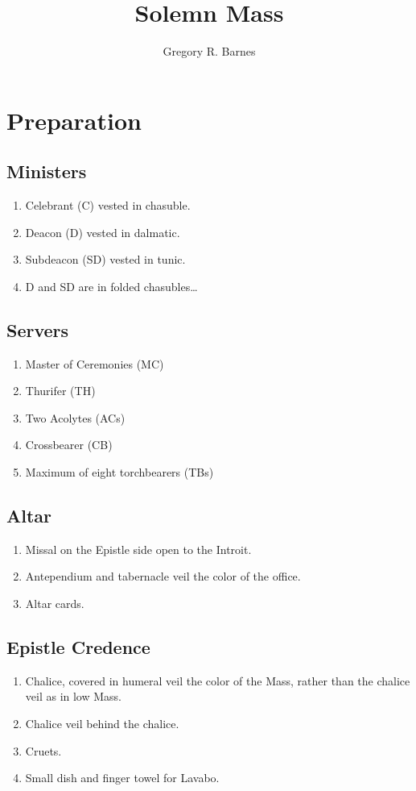 \documentclass[letterpaper, twocolumn]{article}
\title{Solemn Mass}
\author{Gregory R. Barnes}
\begin{document}
	\maketitle
	\section*{Preparation}
	\subsection*{Ministers}
	\begin{enumerate}
		\item Celebrant (C) vested in chasuble.
		\item Deacon (D) vested in dalmatic.
		\item Subdeacon (SD) vested in tunic.
		\item D and SD are in folded chasubles\ldots
	\end{enumerate}
	\subsection*{Servers}
	\begin{enumerate}
		\item Master of Ceremonies (MC)
		\item Thurifer (TH)
		\item Two Acolytes (ACs)
		\item Crossbearer (CB)
		\item Maximum of eight torchbearers (TBs)
	\end{enumerate}
	\subsection*{Altar}
	\begin{enumerate}
		\item Missal on the Epistle side open to the Introit.
		\item Antependium and tabernacle veil the color of the office.
		\item Altar cards.
	\end{enumerate}
	\subsection*{Epistle Credence}
	\begin{enumerate}
		\item Chalice, covered in humeral veil the color of the Mass, rather than the chalice veil as in low Mass.
		\item Chalice veil behind the chalice.
		\item Cruets.
		\item Small dish and finger towel for Lavabo.
	\end{enumerate}
\end{document}

